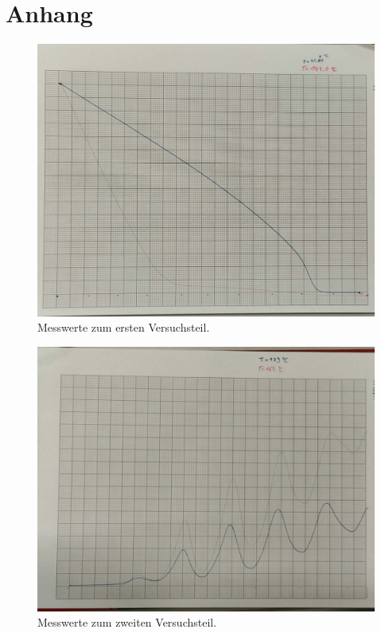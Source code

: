 \section{Anhang}\label{sec:Anhang}
\begin{figure}[h]
   \centering
    \includegraphics[scale=0.25]{build/1.jpeg}
   \caption{Messwerte zum ersten Versuchsteil.}
   \label{fig:1.jpeg}
\end{figure}
\begin{figure}[h]
    \centering
     \includegraphics[scale=0.25]{build/2.jpeg}
    \caption{Messwerte zum zweiten Versuchsteil.}
    \label{fig:2.jpeg}
 \end{figure}
\pagebreak